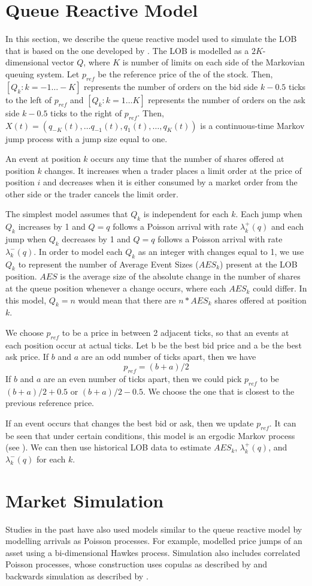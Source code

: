 \section{Queue Reactive Model} \label{modelLOB}
In this section, we describe the queue reactive model used to simulate the LOB that is based on the one developed by \cite{A6}. The LOB is modelled as a $2K$-dimensional vector $Q$, where $K$ is number of limits on each side of the Markovian queuing system. Let $p_{ref}$ be the reference price of the of the stock. Then, $[Q_k: k = -1 \ldots -K]$ represents the number of orders on the bid side $k - 0.5$ ticks to the left of $p_{ref}$ and $[Q_k: k =1 \ldots K]$ represents the number of orders on the ask side $k - 0.5$ ticks to the right of $p_{ref}$. Then, $X(t) = (q_{-K}(t), … q_{-1}(t), q_1(t), … , q_K(t))$ is a continuous-time Markov jump process with a jump size equal to one.


An event at position $k$ occurs any time that the number of shares offered at position $k$ changes. It increases when a trader places a limit order at the price of position $i$ and decreases when it is either consumed by a market order from the other side or the trader cancels the limit order.


The simplest model assumes that $Q_k$ is independent for each $k$. Each jump when $Q_k$ increases by 1 and $Q = q$ follows a Poisson arrival with rate $\lambda^+_k(q)$ and each jump when $Q_k$ decreases by 1 and $Q = q$ follows a Poisson arrival with rate $\lambda^-_k(q)$. In order to model each $Q_k$ as an integer with changes equal to 1, we use $Q_k$ to represent the number of Average Event Sizes ($AES_k$) present at the LOB position. $AES$ is the average size of the absolute change in the number of shares at the queue position whenever a change occurs, where each $AES_k$ could differ. In this model, $Q_k = n$ would mean that there are $n*AES_k$ shares offered at position $k$.


We choose $p_{ref}$ to be a price in between 2 adjacent ticks, so that an events at each position occur at actual ticks. Let b be the best bid price and a be the best ask price. If $b$ and $a$ are an odd number of ticks apart, then we have 
$$p_{ref}=  (b+a)/2$$
If $b$ and $a$ are an even number of ticks apart, then we could pick $p_{ref}$ to be $(b+a)/2 + 0.5$ or $(b+a)/2 - 0.5$. We choose the one that is closest to the previous reference price.

If an event occurs that changes the best bid or ask, then we update $p_{ref}$. It can be seen that under certain conditions, this model is an ergodic Markov process (see \cite{A6}). We can then use historical LOB data to estimate $AES_k$, $\lambda^+_k(q)$, and $\lambda^-_k(q)$ for each $k$.

\section{Market Simulation}
Studies in the past have also used models similar to the queue reactive model by modelling arrivals as Poisson processes. For example, \cite{A9} modelled price jumps of an asset using a bi-dimensional Hawkes process. Simulation also includes correlated Poisson processes, whose construction uses copulas as described by \cite{A8} and backwards simulation as described by \cite{A7}. 